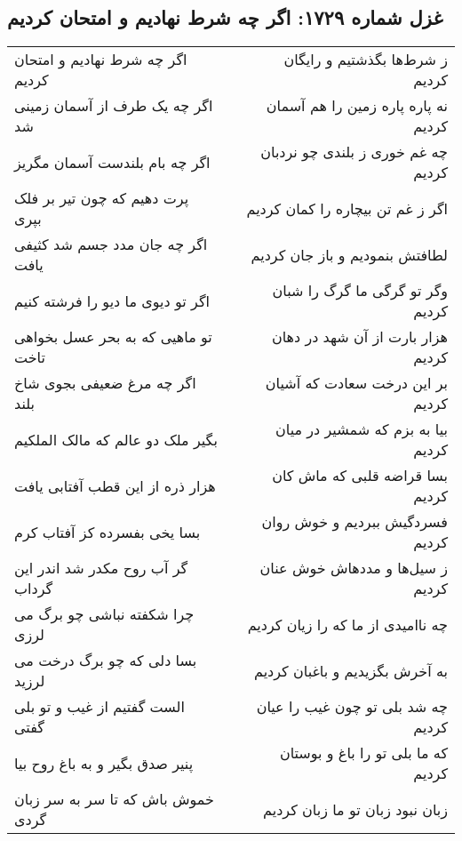 \begin{center}
\section*{غزل شماره ۱۷۲۹: اگر چه شرط نهادیم و امتحان کردیم}
\label{sec:1729}
\begin{longtable}{l p{0.5cm} r}
اگر چه شرط نهادیم و امتحان کردیم
&&
ز شرط‌ها بگذشتیم و رایگان کردیم
\\
اگر چه یک طرف از آسمان زمینی شد
&&
نه پاره پاره زمین را هم آسمان کردیم
\\
اگر چه بام بلندست آسمان مگریز
&&
چه غم خوری ز بلندی چو نردبان کردیم
\\
پرت دهیم که چون تیر بر فلک بپری
&&
اگر ز غم تن بیچاره را کمان کردیم
\\
اگر چه جان مدد جسم شد کثیفی یافت
&&
لطافتش بنمودیم و باز جان کردیم
\\
اگر تو دیوی ما دیو را فرشته کنیم
&&
وگر تو گرگی ما گرگ را شبان کردیم
\\
تو ماهیی که به بحر عسل بخواهی تاخت
&&
هزار بارت از آن شهد در دهان کردیم
\\
اگر چه مرغ ضعیفی بجوی شاخ بلند
&&
بر این درخت سعادت که آشیان کردیم
\\
بگیر ملک دو عالم که مالک الملکیم
&&
بیا به بزم که شمشیر در میان کردیم
\\
هزار ذره از این قطب آفتابی یافت
&&
بسا قراضه قلبی که ماش کان کردیم
\\
بسا یخی بفسرده کز آفتاب کرم
&&
فسردگیش ببردیم و خوش روان کردیم
\\
گر آب روح مکدر شد اندر این گرداب
&&
ز سیل‌ها و مددهاش خوش عنان کردیم
\\
چرا شکفته نباشی چو برگ می لرزی
&&
چه ناامیدی از ما که را زیان کردیم
\\
بسا دلی که چو برگ درخت می لرزید
&&
به آخرش بگزیدیم و باغبان کردیم
\\
الست گفتیم از غیب و تو بلی گفتی
&&
چه شد بلی تو چون غیب را عیان کردیم
\\
پنیر صدق بگیر و به باغ روح بیا
&&
که ما بلی تو را باغ و بوستان کردیم
\\
خموش باش که تا سر به سر زبان گردی
&&
زبان نبود زبان تو ما زبان کردیم
\\
\end{longtable}
\end{center}
